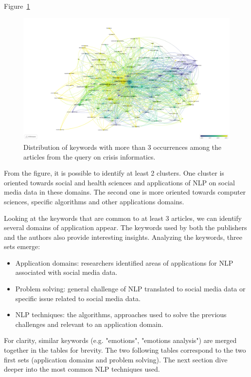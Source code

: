 Figure~\ref{literature:nlp-overlay}

\begin{figure}[bp]
    \includegraphics[width=\paperwidth,height=\paperheight,keepaspectratio, angle=90]{figures/chap-2/nlp-overlay.pdf}
    \caption{Distribution of keywords with more than 3 occurrences among the articles from the query on crisis informatics. }
    \label{literature:nlp-overlay}
\end{figure}



From the figure, it is possible to identify at least 2 clusters.
One cluster is oriented towards social and health sciences and applications of NLP on social media data in these domains.
The second one is more oriented towards computer sciences, specific algorithms and other applications domains.

Looking at the keywords that are common to at least 3 articles, we can identify several domains of application appear.
The keywords used by both the publishers and the authors also provide interesting insights.
Analyzing the keywords, three sets emerge:
\begin{itemize}
    \item Application domains: researchers identified areas of applications for NLP associated with social media data.
    \item Problem solving: general challenge of NLP translated to social media data or specific issue related to social media data.
    \item NLP techniques: the algorithms, approaches used to solve the previous challenges and relevant to an application domain.
\end{itemize}
For clarity, similar keywords (e.g. "emotions", "emotions analysis") are merged together in the tables for brevity.
The two following tables correspond to the two first sets (application domains and problem solving).
The next section dive deeper into the most common NLP techniques used.

